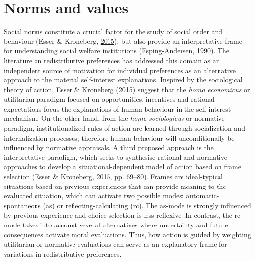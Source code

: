\documentclass[
  12pt,
]{book}
\begin{document}
\hypertarget{norms-and-values}{%
\section{Norms and values}\label{norms-and-values}}

Social norms constitute a crucial factor for the study of social order and behaviour (Esser \& Kroneberg, \protect\hyperlink{ref-esser_integrative_2015}{2015}), but also provide an interpretative frame for understanding social welfare institutions (Esping-Andersen, \protect\hyperlink{ref-esping-andersen_three_1990}{1990}). The literature on redistributive preferences has addressed this domain as an independent source of motivation for individual preferences as an alternative approach to the material self-interest explanations. Inspired by the sociological theory of action, Esser \& Kroneberg (\protect\hyperlink{ref-esser_integrative_2015}{2015}) suggest that the \emph{homo economicus} or utilitarian paradigm focused on opportunities, incentives and rational expectations focus the explanations of human behaviour in the self-interest mechanism. On the other hand, from the \emph{homo sociologicus} or normative paradigm, institutionalized rules of action are learned through socialization and internalization processes, therefore human behaviour will unconditionally be influenced by normative appraisals. A third proposed approach is the interpretative paradigm, which seeks to synthesise rational and normative approaches to develop a situational-dependent model of action based on frame selection (Esser \& Kroneberg, \protect\hyperlink{ref-esser_integrative_2015}{2015}, pp. 69--80). Frames are ideal-typical situations based on previous experiences that can provide meaning to the evaluated situation, which can activate two possible modes: automatic-spontaneous (as) or reflecting-calculating (rc). The as-mode is strongly influenced by previous experience and choice selection is less reflexive. In contrast, the rc-mode takes into account several alternatives where uncertainty and future consequences activate moral evaluations. Thus, how action is guided by weighting utilitarian or normative evaluations can serve as an explanatory frame for variations in redistributive preferences.
\end{document}
